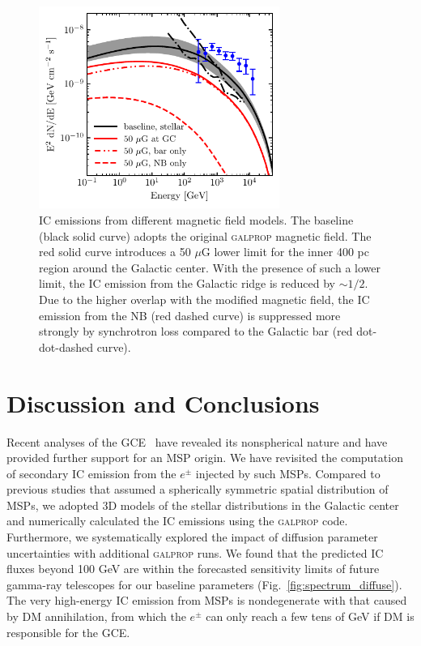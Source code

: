 \documentclass[doublespace,nopageskip]{VTthesis}
\begin{document}
\begin{figure}[htb]
    \centering
    \includegraphics[width=0.7\textwidth]{Figures/IC_MSPs/ics_spectrum_bfields.pdf}
    \caption{IC emissions from different magnetic field models. The baseline (black solid curve) adopts the original \textsc{galprop} magnetic field. The red solid curve introduces a 50 $\mu$G lower limit for the inner 400 pc region around the Galactic center. With the presence of such a lower limit, the IC emission from the Galactic ridge is reduced by $\sim 1/2$. Due to the higher overlap with the modified magnetic field, the IC emission from the NB (red dashed curve) is suppressed more strongly by synchrotron loss compared to the Galactic bar (red dot-dot-dashed curve).}
    \label{fig:spectrum_bfields}
\end{figure}

\section{\label{sec:conclu}Discussion and Conclusions}

Recent analyses of the GCE~\cite{2018NatAs...2..387M,2018NatAs...2..819B,2019JCAP...09..042M} have revealed its nonspherical nature and have provided further support for an MSP origin. We have revisited the computation of secondary IC emission from the $e^\pm$ injected by such MSPs. Compared to previous studies that assumed a spherically symmetric spatial distribution of MSPs, we adopted 3D models of the stellar distributions in the Galactic center and numerically calculated the IC emissions using the \textsc{galprop} code. Furthermore, we systematically explored the impact of diffusion parameter uncertainties with additional \textsc{galprop} runs. We found that the predicted IC fluxes beyond 100 GeV are within the forecasted sensitivity limits of future gamma-ray telescopes for our baseline parameters (Fig.~\ref{fig:spectrum_diffuse}). The very high-energy IC emission from MSPs is nondegenerate with that caused by DM annihilation, from which the $e^\pm$ can only reach a few tens of GeV if DM is responsible for the GCE.
\end{document}

